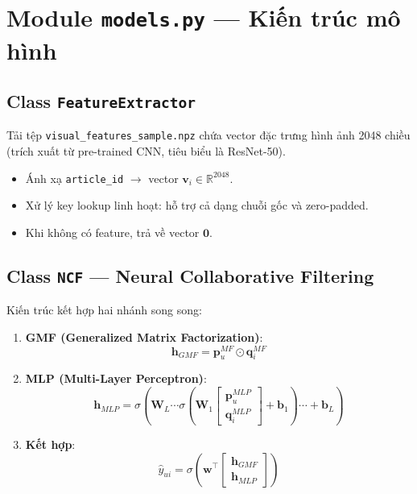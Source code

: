 \documentclass[12pt,a4paper]{article}
\begin{document}
\section{Module \texttt{models.py} — Kiến trúc mô hình}

\subsection{Class \texttt{FeatureExtractor}}

Tải tệp \texttt{visual\_features\_sample.npz} chứa vector đặc trưng hình ảnh
2048 chiều (trích xuất từ pre-trained CNN, tiêu biểu là ResNet-50).

\begin{itemize}[leftmargin=2em]
    \item Ánh xạ \texttt{article\_id} $\to$ vector $\mathbf{v}_i \in \mathbb{R}^{2048}$.
    \item Xử lý key lookup linh hoạt: hỗ trợ cả dạng chuỗi gốc và zero-padded.
    \item Khi không có feature, trả về vector $\mathbf{0}$.
\end{itemize}

\subsection{Class \texttt{NCF} — Neural Collaborative Filtering}

Kiến trúc kết hợp hai nhánh song song:

\begin{enumerate}[leftmargin=2em]
    \item \textbf{GMF (Generalized Matrix Factorization)}:
    \begin{equation}
        \mathbf{h}_{GMF} = \mathbf{p}_u^{MF} \odot \mathbf{q}_i^{MF}
    \end{equation}
    
    \item \textbf{MLP (Multi-Layer Perceptron)}:
    \begin{equation}
        \mathbf{h}_{MLP} = \sigma\!\left(
            \mathbf{W}_L \cdots \sigma\!\left(
                \mathbf{W}_1 \begin{bmatrix} \mathbf{p}_u^{MLP} \\ \mathbf{q}_i^{MLP} \end{bmatrix}
                + \mathbf{b}_1
            \right) \cdots + \mathbf{b}_L
        \right)
    \end{equation}
    
    \item \textbf{Kết hợp}:
    \begin{equation}
        \hat{y}_{ui} = \sigma\!\left(
            \mathbf{w}^{\top} \begin{bmatrix} \mathbf{h}_{GMF} \\ \mathbf{h}_{MLP} \end{bmatrix}
        \right)
    \end{equation}
\end{enumerate}
\end{document}
